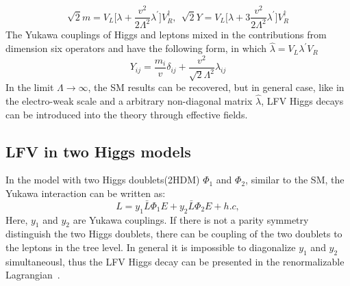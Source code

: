 \begin{equation}
\sqrt{2}m=V_{L}\Big[\lambda+\frac{v^{2}}{2\Lambda^{2}}\lambda^{'}\Big]V^{\dagger}_{R},~~\sqrt{2}Y=V_{L}\Big[\lambda+3\frac{v^{2}}{2\Lambda^{2}}\lambda^{'}\Big]V^{\dagger}_{R}
\end{equation}
The Yukawa couplings of Higgs and leptons mixed in the contributions from dimension six operators and have the following form, in which $\hat{\lambda}=V_{L}\lambda^{'}V_{R}$
\begin{equation}
Y_{ij}=\frac{m_{i}}{v}\delta_{ij}+\frac{v^{2}}{\sqrt{2}\Lambda^{2}}\hat{\lambda}_{ij}
\end{equation}
In the limit $\Lambda \to \infty$, the SM results can be recovered, but in general case, like in the electro-weak scale and a arbitrary non-diagonal matrix $\hat{\lambda}$, LFV Higgs decays can be introduced into the theory through effective fields.




\subsection{LFV in two Higgs models}

In the model with two Higgs doublets(2HDM) $\Phi_{1}$ and $\Phi_{2}$, similar to the SM, the Yukawa interaction can be written as: 
\begin{equation}
L=y_{1}\bar{L}\Phi_{1}E+y_{2}\bar{L}\Phi_{2}E+h.c,
\end{equation}
Here, $y_{1}$ and $y_{2}$ are Yukawa couplings. If there is not a parity symmetry distinguish the two Higgs doublets, there can be coupling of the two doublets to the leptons in the tree level. In general it is impossible to diagonalize $y_{1}$ and $y_{2}$ simultaneousl, thus the LFV Higgs decay can be presented in the renormalizable Lagrangian~\cite{deLima2015}.%


